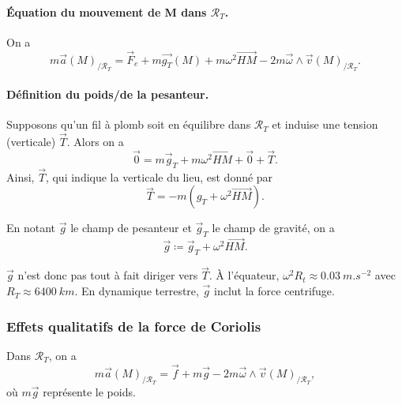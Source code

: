            \paragraph{Équation du mouvement de M dans $\mathcal{R}_T$.}
            On a 
            \begin{equation}
                m\vec{a}(M)_{/\mathcal{R}_T}=\vec{F}_e+m\vec{g_T}(M)+m\omega^{2}\vec{HM}-2m\vec{\omega}\wedge\vec{v}(M)_{/\mathcal{R}_T}.
            \end{equation}

            \paragraph{Définition du poids/de la pesanteur.}
            Supposons qu'un fil à plomb soit en équilibre dans $\mathcal{R}_T$ et induise une tension (verticale) $\vec{T}$. Alors on a 
            \begin{equation}
                \vec{0}=m\vec{g}_T+m\omega^{2}\vec{HM}+\vec{0}+\vec{T}.
            \end{equation}
            Ainsi, $\vec{T}$, qui indique la verticale du lieu, est donné par
            \begin{equation}
                \vec{T}=-m\left(g_T+\omega^{2}\vec{HM}\right).
            \end{equation}

            \begin{definition}
                    En notant $\vec{g}$ le champ de pesanteur et $\vec{g}_{T}$ le champ de gravité, on a
                    \begin{equation}
                        \boxed{
                        \vec{g}\coloneqq \vec{g}_T+\omega^{2}\vec{HM}.}
                    \end{equation}
            \end{definition}

            $\vec{g}$ n'est donc pas tout à fait diriger vers $\vec{T}$. À l'équateur, $\omega^{2}R_t\approx0.03~m.s^{-2}$ avec $R_T\approx 6400~km$. En dynamique terrestre, $\vec{g}$ inclut la force centrifuge.

        \subsubsection{Effets qualitatifs de la force de Coriolis}

            Dans $\mathcal{R}_T$, on a 
            \begin{equation}
                m\vec{a}(M)_{/\mathcal{R}_T}=\vec{f}+m\vec{g}-2m\vec{\omega}\wedge\vec{v}(M)_{/\mathcal{R}_T},
            \end{equation}
            où $m\vec{g}$ représente le poids.

